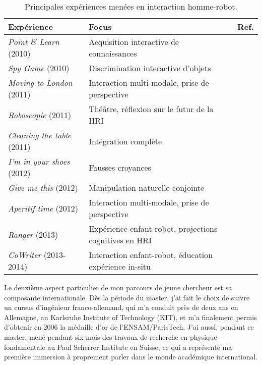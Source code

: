 \documentclass[a4paper]{article}
\begin{document}
\begin{table*}
\begin{center}

    \begin{tabular}{lp{6cm}l}
\bf{Expérience} & Focus & Ref. \\
\hline
{\it Point \& Learn} (2010) & Acquisition interactive de connaissances &
\cite{lemaignan2010oro} \\
{\it Spy Game} (2010) & Discrimination interactive d'objets & \cite{ros2010which} \\
{\it Moving to London} (2011) & Interaction multi-modale, \newline prise de perspective & \cite{lemaignan2011what} \\
{\it Roboscopie} (2011) & Théâtre, \newline réflexion sur le futur de la HRI & \cite{lemaignan2012roboscopie} \\
{\it Cleaning the table} (2011) & Intégration complète & \cite{alami2011when} \\
{\it I'm in your shoes} (2012) & Fausses croyances & \cite{warnier2012when} \\
{\it Give me this} (2012) & Manipulation naturelle conjointe & \cite{gharbi2013natural} \\
{\it Aperitif time} (2012) & Interaction multi-modale, \newline prise de perspective & \cite{lemaignan2013talking} \\
{\it Ranger} (2013) & Expérience enfant-robot, \newline projections cognitives en HRI & \cite{fink2014which, lemaignan2014dynamics} \\
{\it CoWriter} (2013-2014) & Interaction enfant-robot, éducation \newline expérience in-situ & \cite{hood2015when,lemaignan2014taught, hood2015cowriter} \\
\hline

\end{tabular}
\end{center}
\caption{Principales expériences menées en interaction homme-robot.}
\label{experiences}
\end{table*}


Le deuxième aspect particulier de mon parcours de jeune chercheur est sa
composante internationale. Dès la période du master, j'ai fait le choix de
suivre un cursus d'ingénieur franco-allemand, qui m'a conduit près de deux ans
en Allemagne, au Karlsruhe Institute of Technology (KIT), et m'a finalement
permis d'obtenir en 2006 la médaille d'or de l'ENSAM/ParisTech. J'ai aussi,
pendant ce master, mené pendant six mois des travaux de recherche en physique
fondamentale au Paul Scherrer Institute en Suisse, ce qui a représenté ma
première immersion à proprement parler dans le monde académique international.
\end{document}
